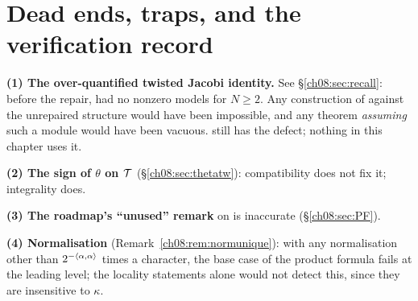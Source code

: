 \section{Dead ends, traps, and the verification record}\label{ch08:sec:deadends}

\begin{warning}
\textbf{(1) The over-quantified twisted Jacobi identity.}  See \S\ref{ch08:sec:recall}: before the
repair,  had no nonzero models for $N\ge2$.  Any construction of
 against the unrepaired structure would have been impossible, and any
theorem \emph{assuming} such a module would have been vacuous.  
still has the defect; nothing in this chapter uses it.

\textbf{(2) The sign of $\theta$ on $\mathcal{T}$} (\S\ref{ch08:sec:thetatw}): compatibility does not
fix it; integrality does.

\textbf{(3) The roadmap's ``unused'' remark} on  is inaccurate
(\S\ref{ch08:sec:PF}).

\textbf{(4) Normalisation} (Remark~\ref{ch08:rem:normunique}): with any normalisation other than
$2^{-\langle \alpha,\alpha\rangle}$ times a character, the base case of the product formula fails at the
leading level; the locality statements alone would not detect this, since they are insensitive to
$\kappa$.
\end{warning}

